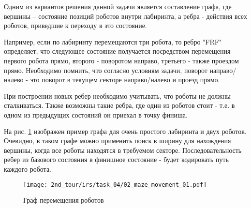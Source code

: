 \solutionSection

Одним из вариантов решения данной задачи является составление графа, где вершины – состояние позиций роботов внутри лабиринта, а ребра - действия всех роботов, приведшие к переходу в это состояние. 

Например, если по лабиринту перемещаются три робота, то ребро "FRF" определяет, что следующее состояние получается посредством перемещения первого робота прямо, второго - поворотом направо, третьего - также проездом прямо. Необходимо помнить, что согласно условиям задачи, поворот направо/налево - это поворот в текущем секторе направо/налево и проезд прямо. 

При построении новых ребер необходимо учитывать, что роботы не должны сталкиваться. Также возможны такие ребра, где один из роботов стоит - т.е. в одном из предыдущих состояний он приехал в точку финиша.

На рис. \ref{fig:02_maze_movement_01} изображен пример графа для очень простого лабиринта и двух роботов. 
Очевидно, в таком графе можно применить поиск в ширину для нахождения вершины, когда все роботы находятся в требуемом секторе. Последовательность ребер из базового состояния в финишное состояние - будет кодировать путь каждого робота.

\begin{figure}[h!]
	\centering
	\texttt{[image: 2nd\_tour/irs/task\_04/02\_maze\_movement\_01.pdf]}
	\caption{Граф перемещения роботов}
	\label{fig:02_maze_movement_01}
\end{figure}


\codeExample

{}
